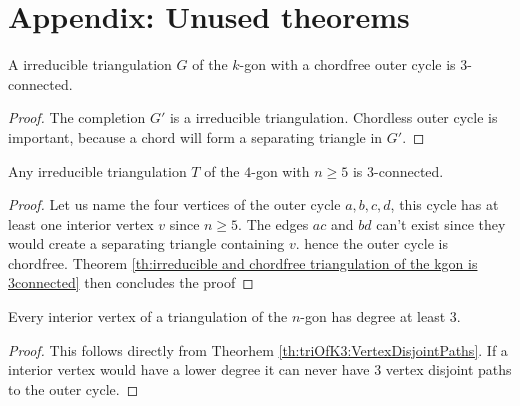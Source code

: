 
\section{Appendix: Unused theorems}


\begin{thrm}
\label{th:irreducible and chordfree triangulation of the kgon is 3connected}
A irreducible triangulation $G$ of the $k$-gon with a chordfree outer cycle is $3$-connected.
\end{thrm}
\begin{proof}
  The completion $G'$ is a irreducible triangulation. Chordless outer cycle is important, because a chord will form a separating triangle in $G'$.
\end{proof}

\begin{thrm}
  Any irreducible triangulation $T$ of the $4$-gon with $n \geq 5$ is $3$-connected.
\end{thrm}
\begin{proof}
  Let us name the four vertices of the outer cycle $a,b,c,d$, this cycle has at least one interior vertex $v$ since $n\geq 5$. The edges $ac$ and $bd$ can't exist since they would create a separating triangle containing $v$. hence the outer cycle is chordfree.
  Theorem \ref{th:irreducible and chordfree triangulation of the kgon is 3connected} then concludes the proof
\end{proof}


\begin{thrm}
  Every interior vertex of a triangulation of the $n$-gon has degree at least $3$.
\end{thrm}

\begin{proof}
  This follows directly from Theorhem \ref{th:triOfK3:VertexDisjointPaths}. If a interior vertex would have a lower degree it can never have $3$ vertex disjoint paths to the outer cycle.
\end{proof}


